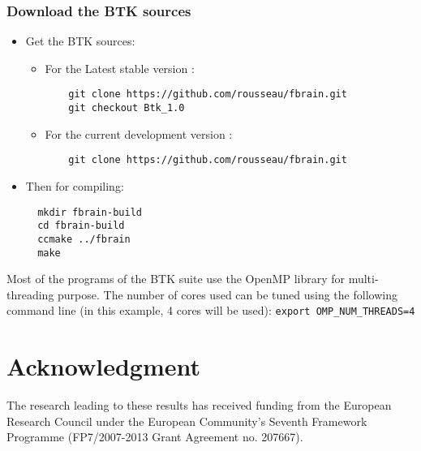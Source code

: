 \documentclass[a4paper,10pt]{article}
\begin{document}
  \subsubsection{Download the BTK sources}

  \begin{itemize}
  \item Get the BTK sources:
    \begin{itemize}
    \item For the Latest stable version :
    \begin{verbatim}
    git clone https://github.com/rousseau/fbrain.git
    git checkout Btk_1.0 
    \end{verbatim}
    \item For the current development version :
    \begin{verbatim}
    git clone https://github.com/rousseau/fbrain.git
    \end{verbatim}  
    \end{itemize}
  \item Then for compiling:
  \begin{verbatim}
  mkdir fbrain-build
  cd fbrain-build
  ccmake ../fbrain
  make
  \end{verbatim}

  \end{itemize}

  Most of the programs of the BTK suite use the OpenMP library for multi-threading
  purpose. The number of cores used can be tuned using the following command line
  (in this example, 4 cores will be used): \texttt{export OMP\_NUM\_THREADS=4}


  


  \section*{Acknowledgment}
  \small{The research leading to these results has received funding from the
  European Research Council under the European Community’s Seventh Framework
  Programme (FP7/2007-2013 Grant Agreement no. 207667).}


  
\end{document}
